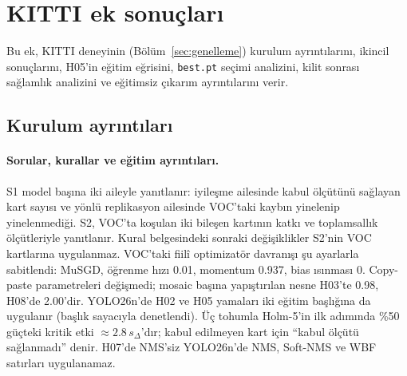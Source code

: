 \setcounter{table}{0}\setcounter{figure}{0}
\section{KITTI ek sonuçları}\label{sec:ek-ikincil}

Bu ek, KITTI deneyinin (Bölüm~\ref{sec:genelleme}) kurulum ayrıntılarını, ikincil sonuçlarını, H05'in eğitim eğrisini, \texttt{best.pt} seçimi analizini, kilit sonrası sağlamlık analizini ve eğitimsiz çıkarım ayrıntılarını verir.

\subsection{Kurulum ayrıntıları}\label{sec:ek-kitti-kurulum}

\paragraph{Sorular, kurallar ve eğitim ayrıntıları.}
S1 model başına iki aileyle yanıtlanır: iyileşme ailesinde kabul ölçütünü sağlayan kart sayısı ve yönlü replikasyon ailesinde VOC'taki kaybın yinelenip yinelenmediği. S2, VOC'ta koşulan iki bileşen kartının katkı ve toplamsallık ölçütleriyle yanıtlanır. Kural belgesindeki sonraki değişiklikler S2'nin VOC kartlarına uygulanmaz. VOC'taki fiilî optimizatör davranışı şu ayarlarla sabitlendi: MuSGD, öğrenme hızı 0.01, momentum 0.937, bias ısınması 0. Copy-paste parametreleri değişmedi; mosaic başına yapıştırılan nesne H03'te 0.98, H08'de 2.00'dir. YOLO26n'de H02 ve H05 yamaları iki eğitim başlığına da uygulanır (başlık sayacıyla denetlendi). Üç tohumla Holm-5'in ilk adımında \%50 güçteki kritik etki $\approx2.8\,s_\Delta$'dır; kabul edilmeyen kart için ``kabul ölçütü sağlanmadı'' denir. H07'de NMS'siz YOLO26n'de NMS, Soft-NMS ve WBF satırları uygulanamaz.

